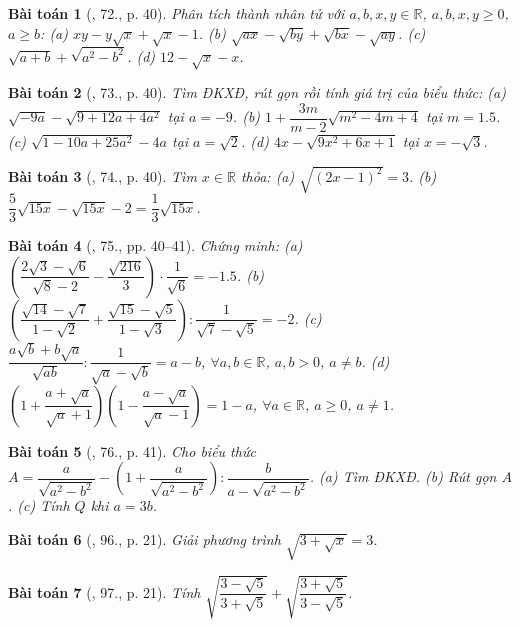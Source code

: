 \documentclass{article}
\newtheorem{baitoan}{Bài toán}
\begin{document}
\begin{baitoan}[\cite{SGK_Toan_9_tap_1}, 72., p. 40]
	Phân tích thành nhân tử với $a,b,x,y\in\mathbb{R}$, $a,b,x,y\ge0$, $a\ge b$: (a) $xy - y\sqrt{x} + \sqrt{x} - 1$. (b) $\sqrt{ax} - \sqrt{by} + \sqrt{bx} - \sqrt{ay}$. (c) $\sqrt{a + b} + \sqrt{a^2 - b^2}$. (d) $12 - \sqrt{x} - x$.
\end{baitoan}

\begin{baitoan}[\cite{SGK_Toan_9_tap_1}, 73., p. 40]
	Tìm ĐKXĐ, rút gọn rồi tính giá trị của biểu thức: (a) $\sqrt{-9a} - \sqrt{9 + 12a + 4a^2}$ tại $a = -9$. (b) $1 + \dfrac{3m}{m - 2}\sqrt{m^2 - 4m + 4}$ tại $m = 1.5$. (c) $\sqrt{1 - 10a + 25a^2} - 4a$ tại $a = \sqrt{2}$. (d) $4x - \sqrt{9x^2 + 6x + 1}$ tại $x = -\sqrt{3}$.
\end{baitoan}

\begin{baitoan}[\cite{SGK_Toan_9_tap_1}, 74., p. 40]
	Tìm $x\in\mathbb{R}$ thỏa: (a) $\sqrt{(2x - 1)^2} = 3$. (b) $\dfrac{5}{3}\sqrt{15x} - \sqrt{15x} - 2 = \dfrac{1}{3}\sqrt{15x}$.
\end{baitoan}

\begin{baitoan}[\cite{SGK_Toan_9_tap_1}, 75., pp. 40--41]
	Chứng minh: (a) $\left(\dfrac{2\sqrt{3} - \sqrt{6}}{\sqrt{8} - 2} - \dfrac{\sqrt{216}}{3}\right)\cdot\dfrac{1}{\sqrt{6}} = -1.5$. (b) $\left(\dfrac{\sqrt{14} - \sqrt{7}}{1 - \sqrt{2}} + \dfrac{\sqrt{15} - \sqrt{5}}{1 - \sqrt{3}}\right):\dfrac{1}{\sqrt{7} - \sqrt{5}} = -2$. (c) $\dfrac{a\sqrt{b} + b\sqrt{a}}{\sqrt{ab}}:\dfrac{1}{\sqrt{a} - \sqrt{b}} = a - b$, $\forall a,b\in\mathbb{R}$, $a,b > 0$, $a\ne b$. (d) $\left(1 + \dfrac{a + \sqrt{a}}{\sqrt{a} + 1}\right)\left(1 - \dfrac{a - \sqrt{a}}{\sqrt{a} - 1}\right) = 1 - a$, $\forall a\in\mathbb{R}$, $a\ge0$, $a\ne1$.
\end{baitoan}

\begin{baitoan}[\cite{SGK_Toan_9_tap_1}, 76., p. 41]
	Cho biểu thức $A = \dfrac{a}{\sqrt{a^2 - b^2}} - \left(1 + \dfrac{a}{\sqrt{a^2 - b^2}}\right):\dfrac{b}{a - \sqrt{a^2 - b^2}}$. (a) Tìm ĐKXĐ. (b) Rút gọn $A$. (c) Tính $Q$ khi $a = 3b$.
\end{baitoan}

\begin{baitoan}[\cite{SBT_Toan_9_tap_1}, 96., p. 21]
	Giải phương trình $\sqrt{3 + \sqrt{x}} = 3$.
\end{baitoan}

\begin{baitoan}[\cite{SBT_Toan_9_tap_1}, 97., p. 21]
	Tính $\sqrt{\dfrac{3 - \sqrt{5}}{3 + \sqrt{5}}} + \sqrt{\dfrac{3 + \sqrt{5}}{3 - \sqrt{5}}}$.
\end{baitoan}
\end{document}

